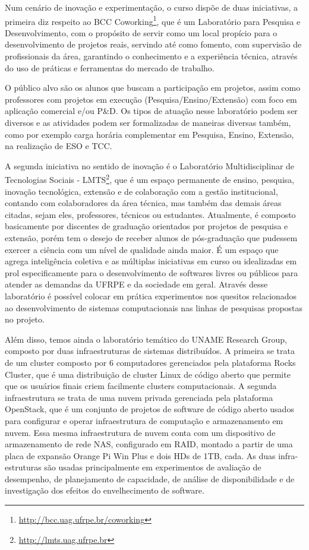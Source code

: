\documentclass[
	12pt,				%
	openright,			%
  oneside,     %
	a4paper,			%
	chapter=TITLE,		%
	english,			%
	french,				%
	spanish,			%
	brazil				%
	]{abntex2}
\begin{document}
Num cenário de inovação e experimentação, o curso dispõe de duas iniciativas, a primeira diz respeito ao BCC Coworking\footnote{\url{http://bcc.uag.ufrpe.br/coworking}}, que é um Laboratório para Pesquisa e Desenvolvimento, com o propósito de servir como um local propício para o desenvolvimento de projetos reais, servindo até como fomento, com supervisão de profissionais da área, garantindo o conhecimento e a experiência técnica, através do uso de práticas e ferramentas do mercado de trabalho. 

O público alvo são os alunos que buscam a participação em projetos, assim como professores com projetos em execução (Pesquisa/Ensino/Extensão) com foco em aplicação comercial e/ou P\&D. Os tipos de atuação nesse laboratório podem ser diversos e as atividades podem ser formalizadas de maneiras diversas também, como por exemplo carga horária complementar em Pesquisa, Ensino, Extensão, na realização de ESO e TCC.

A segunda iniciativa no sentido de inovação é o Laboratório Multidisciplinar de Tecnologias Sociais - LMTS\footnote{\url{http://lmts.uag.ufrpe.br}}, que é um espaço permanente de ensino, pesquisa, inovação tecnológica, extensão e de colaboração com a gestão institucional, contando com colaboradores da área técnica, mas também das demais áreas citadas, sejam eles, professores, técnicos ou estudantes. Atualmente, é composto basicamente por discentes de graduação orientados por projetos de pesquisa e extensão, porém tem o desejo de receber alunos de pós-graduação que pudessem exercer a ciência com um nível de qualidade ainda maior. É um espaço que agrega inteligência coletiva e as múltiplas iniciativas em curso ou idealizadas em prol especificamente para o desenvolvimento de softwares livres ou públicos para atender as demandas da UFRPE e da sociedade em geral. Através desse laboratório é possível colocar em prática experimentos nos quesitos relacionados ao desenvolvimento de sistemas computacionais nas linhas de pesquisas propostas no projeto.

Além disso, temos ainda o laboratório temático do UNAME Research Group, composto por duas infraestruturas de sistemas distribuídos. A primeira se trata de um cluster composto por 6 computadores gerenciados pela plataforma Rocks Cluster, que é uma distribuição de cluster Linux de código aberto que permite que os usuários finais criem facilmente clusters computacionais. A segunda infraestrutura se trata de uma nuvem privada gerenciada pela plataforma OpenStack, que é um conjunto de projetos de software de código aberto usados para configurar e operar infraestrutura de computação e armazenamento em nuvem. Essa mesma infraestrutura de nuvem conta com um dispositivo de armazenamento de rede NAS, configurado em RAID, montado a partir de uma placa de expansão Orange Pi Win Plus e dois HDs de 1TB, cada. As duas infra-estruturas são usadas principalmente em experimentos de avaliação de desempenho, de planejamento de capacidade, de análise de disponibilidade e de investigação dos efeitos do envelhecimento de software. 
\end{document}
